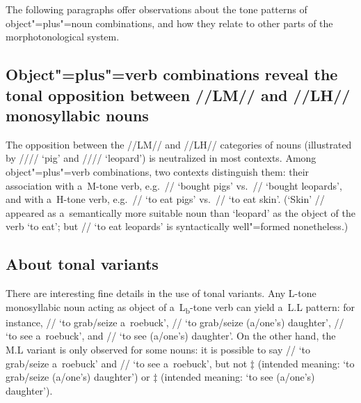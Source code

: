 The following paragraphs offer observations about the tone patterns of object"=plus"=noun combinations, and how they relate to other parts of the morphotonological system. 


\subsection[Evidence of the opposition between \mbox{//LM//} and \mbox{//LH//}]{Object"=plus"=verb combinations reveal the tonal opposition between \mbox{//LM//} and \mbox{//LH//} {monosyllabic} nouns}
\label{sec:usefulnessofelicitingobjectverbcombinationstodistinguishtheLMandLHcategoriesofverbs}

The opposition between the \mbox{//LM//} and \mbox{//LH//} categories of nouns (illustrated by ////
‘pig’ and //// ‘leopard’) is neutralized in most contexts. Among object"=plus"=verb combinations,
two contexts distinguish them: their association with a~M-tone verb, e.g.~// ‘bought pigs’ vs.\ // ‘bought leopards’, and with a~H-tone verb,
e.g.~// ‘to eat pigs’ vs.\ // ‘to eat skin’. (‘Skin' // appeared as a~semantically more suitable noun than ‘leopard’ as the object of the verb ‘to eat’; but // ‘to eat leopards’ is syntactically well"=formed nonetheless.) 

\subsection{About tonal variants}
\label{sec:abouttonalvariants}

There are interesting fine details in the use of tonal variants. Any L-tone {monosyllabic} noun acting
as object of a~L\textsubscript{b}-tone verb can yield a~L.L pattern: for instance, // ‘to grab/seize
a~roebuck’, // ‘to grab/seize (a/one’s) daughter’, // ‘to see
a~roebuck’, and // ‘to see (a/one’s) daughter’. On the other hand, the M.L variant is only
observed for some nouns: it is possible to say // ‘to grab/seize a~roebuck’ and
// ‘to see a~roebuck’, but not $\ddagger${\kern2pt} (intended meaning: ‘to grab/seize
(a/one’s) daughter’) or $\ddagger${\kern2pt} (intended meaning: ‘to see (a/one’s) daughter’).

